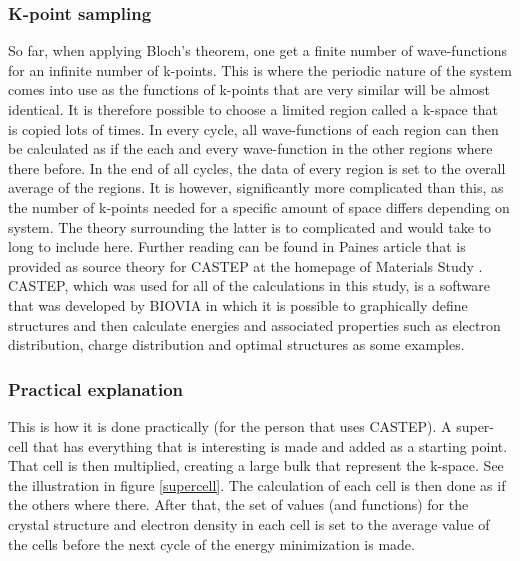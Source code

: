 \documentclass[12pt,a4paper]{article}
\begin{document}
\subsubsection{K-point sampling}
So far, when applying Bloch's theorem, one get a finite number of wave-functions for an infinite number of k-points. This is where the periodic nature of the system comes into use as the functions of k-points that are very similar will be almost identical. It is therefore possible to choose a limited region called a k-space that is copied lots of times. In every cycle, all wave-functions of each region can then be calculated as if the each and every wave-function in the other regions  where there before. In the end of all cycles, the data of every region is set to the overall average of the regions. It is however, significantly more complicated than this, as the number of k-points needed for a specific amount of space differs depending on system. The theory surrounding the latter is to complicated and would take to long to include here. Further reading can be found in Paines article that is provided as source theory for CASTEP at the homepage of Materials Study \cite{paine}. CASTEP, which was used for all of the calculations in this study, is a software that was developed by BIOVIA in which it is possible to graphically  define structures and then calculate energies and associated properties such as electron distribution, charge distribution and optimal structures as some examples. 

\subsubsection{Practical explanation}
This is how it is done practically (for the person that uses CASTEP). A super-cell that has everything that is interesting is made and added as a starting point. That cell is then multiplied, creating a large bulk that represent the k-space. See the illustration in figure \ref{supercell}. The calculation of each cell is then done as if the others where there. After that, the set of values (and functions) for the crystal structure and electron density in each cell is set to the average value of the cells before the next cycle of the energy minimization is made.
\end{document}
